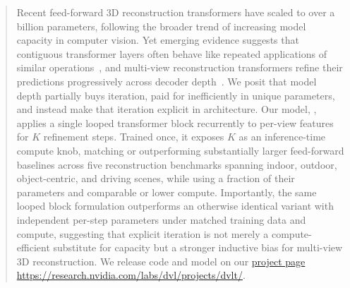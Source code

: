 

\begin{abstract}
Recent feed-forward 3D reconstruction transformers have scaled to over a billion parameters, following the broader trend of increasing model capacity in computer vision. Yet emerging evidence suggests that contiguous transformer layers often behave like repeated applications of similar operations~\citep{jacobs2025raptor}, and multi-view reconstruction transformers refine their predictions progressively across decoder depth~\citep{stary2025understanding}. We posit that model depth partially buys iteration, paid for inefficiently in unique parameters, and instead make that iteration explicit in architecture. Our model, \methodname, applies a single looped transformer block recurrently to per-view features for $K$ refinement steps. Trained once, it exposes $K$ as an inference-time compute knob, matching or outperforming substantially larger feed-forward baselines across five reconstruction benchmarks spanning indoor, outdoor, object-centric, and driving scenes, while using a fraction of their parameters and comparable or lower compute. Importantly, the same looped block formulation outperforms an otherwise identical variant with independent per-step parameters under matched training data and compute, suggesting that explicit iteration is not merely a compute-efficient substitute for capacity but a stronger inductive bias for multi-view 3D reconstruction. We release code and model on our \href{https://research.nvidia.com/labs/dvl/projects/dvlt/}{project page https://research.nvidia.com/labs/dvl/projects/dvlt/}.
\end{abstract}
\vspace{-6mm}
